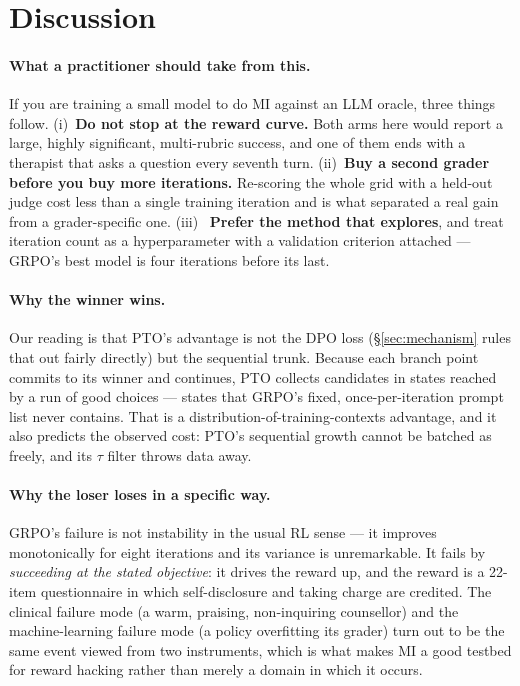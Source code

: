 \section{Discussion}
\label{sec:discussion}

\paragraph{What a practitioner should take from this.}
If you are training a small model to do MI against an LLM oracle, three things follow.
(i)~\textbf{Do not stop at the reward curve.} Both arms here would report a large, highly
significant, multi-rubric success, and one of them ends with a therapist that asks a
question every seventh turn. (ii)~\textbf{Buy a second grader before you buy more
iterations.} Re-scoring the whole grid with a held-out judge cost less than a single
training iteration and is what separated a real gain from a grader-specific one. (iii)~
\textbf{Prefer the method that explores}, and treat iteration count as a hyperparameter with
a validation criterion attached --- GRPO's best model is four iterations before its last.

\paragraph{Why the winner wins.}
Our reading is that PTO's advantage is not the DPO loss (\S\ref{sec:mechanism} rules that
out fairly directly) but the sequential trunk. Because each branch point commits to its
winner and continues, PTO collects candidates in states reached by a run of good choices ---
states that GRPO's fixed, once-per-iteration prompt list never contains. That is a
distribution-of-training-contexts advantage, and it also predicts the observed cost: PTO's
sequential growth cannot be batched as freely, and its $\tau$ filter throws data away.

\paragraph{Why the loser loses in a specific way.}
GRPO's failure is not instability in the usual RL sense --- it improves monotonically for
eight iterations and its variance is unremarkable. It fails by \emph{succeeding at the
stated objective}: it drives the reward up, and the reward is a 22-item questionnaire in
which self-disclosure and taking charge are credited. The clinical failure mode
(a warm, praising, non-inquiring counsellor) and the machine-learning failure mode (a policy
overfitting its grader) turn out to be the same event viewed from two instruments, which is
what makes MI a good testbed for reward hacking rather than merely a domain in which it
occurs.

